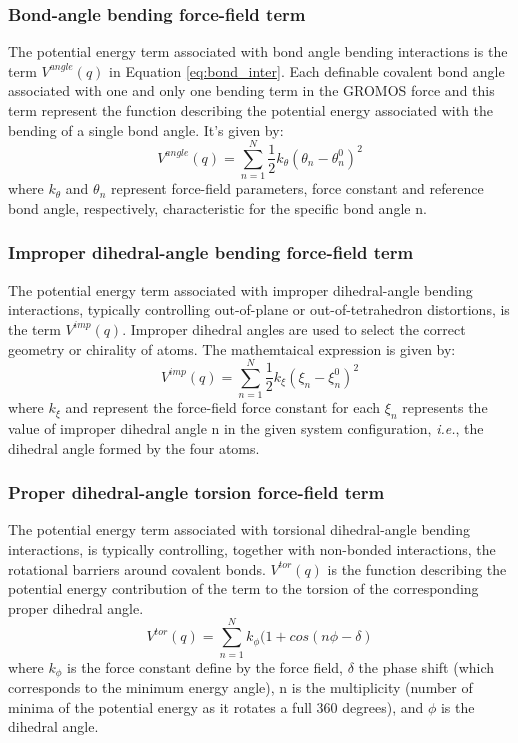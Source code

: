 \subsubsection*{Bond-angle bending force-field term}
The potential energy term associated with bond angle bending interactions is the term $V^{angle}(q)$ in Equation \ref{eq:bond_inter}. Each definable covalent bond angle associated with one and only one bending term in the GROMOS force and this term represent the function describing the potential energy associated with the bending of a single bond angle. It's given by: 
\begin{equation}
    V^{angle}(q)=\sum_{n=1}^{N}\frac{1}{2}k_{\theta }{(\theta_{n}-\theta _{n}^{0})}^2
    \label{eq:angle_bond}
\end{equation}
where $k_{\theta }$ and $\theta _{n}$ represent force-field parameters, force constant and reference bond angle, respectively, characteristic for the specific bond angle n. 

\subsubsection*{Improper dihedral-angle bending force-field term}

The potential energy term associated with improper dihedral-angle bending interactions, typically controlling out-of-plane or out-of-tetrahedron distortions, is the term $V^{imp}(q)$. Improper dihedral angles are used to select the correct geometry or chirality of atoms. The mathemtaical expression is given by:
\begin{equation}
    V^{imp}(q)=\sum_{n=1}^{N}\frac{1}{2}k_{\xi}{(\xi_{n}-\xi_{n}^{0})}^2
    \label{eq:improper_bond}
\end{equation}
where $k_{\xi}$ and represent the force-field force constant for each $\xi_{n}$ represents the value of improper dihedral angle n in the given system configuration, \textit{i.e.}, the dihedral angle formed by the four atoms. 

\subsubsection*{Proper dihedral-angle torsion force-field term}
The potential energy term associated with torsional dihedral-angle bending interactions, is typically controlling, together with non-bonded interactions, the rotational barriers around covalent bonds. $V^{tor}(q)$ is the function describing the potential energy contribution of the term to the torsion of the corresponding proper dihedral angle.
\begin{equation}
     V^{tor}(q)=\sum_{n=1}^{N}k_{\phi}(1+cos(n\phi-\delta)
     \label{eq:torcional_bond}
\end{equation}
where $k_{\phi}$ is the force constant define by the force field, $\delta$ the phase shift (which corresponds to the minimum energy angle), n is the multiplicity (number of minima of the potential energy as it rotates a full 360 degrees), and $\phi$ is the dihedral angle.

